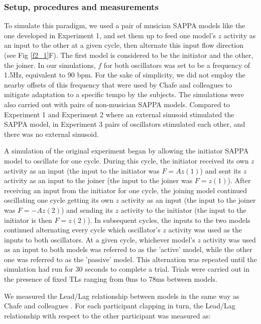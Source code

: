 \documentclass{report}
\begin{document}
\subsubsection{Setup, procedures and measurements}

To simulate this paradigm, we used a pair of musician SAPPA models like the one developed in Experiment 1, and set them up to feed one model's $z$ activity as an input to the other at a given cycle, then alternate this input flow direction (see Fig \ref{f2_1}F). The first model is considered to be the initiator and the other, the joiner. In our simulations, $f$ for both oscillators was set to be a frequency of 1.5Hz, equivalent to 90 bpm. For the sake of simplicity, we did not employ the nearby offsets of this frequency that were used by Chafe and colleagues \cite{chafe2010effect} to mitigate adaptation to a specific tempo by the subjects. The simulations were also carried out with pairs of non-musician SAPPA models. Compared to Experiment 1 and Experiment 2 where an external sinusoid stimulated the SAPPA model, in Experiment 3 pairs of oscillators stimulated each other, and there was no external sinusoid.

A simulation of the original experiment began by allowing the initiator SAPPA model to oscillate for one cycle. During this cycle, the initiator received its own $z$ activity as an input (the input to the initiator was $F = Az(1)$) and sent its $z$ activity as an input to the joiner (the input to the joiner was $F = z(1)$). After receiving an input from the initiator for one cycle, the joining model continued oscillating one cycle getting its own $z$ activity as an input (the input to the joiner was $F = -Az(2)$) and sending its $z$ activity to the initiator (the input to the initiator is then $F = z(2)$). In subsequent cycles, the inputs to the two models continued alternating every cycle which oscillator's $z$ activity was used as the inputs to both oscillators. At a given cycle, whichever model's $z$ activity was used as an input to both models was referred to as the 'active' model, while the other one was referred to as the 'passive' model. This alternation was repeated until the simulation had run for 30 seconds to complete a trial. Trials were carried out in the presence of fixed TLs ranging from 0ms to 78ms between models.

We measured the Lead/Lag relationship between models in the same way as Chafe and colleagues \cite{chafe2010effect}. For each participant clapping in turn, the Lead/Lag relationship with respect to the other participant was measured as: 
\end{document}
